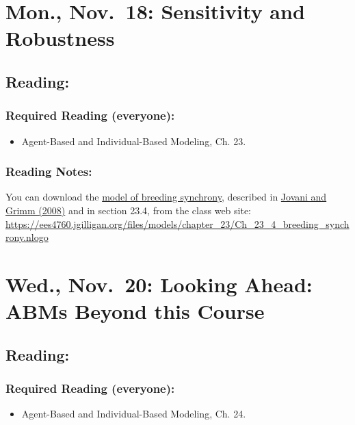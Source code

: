 \documentclass[
]{article}
\providecommand{\tightlist}{%
  \setlength{\itemsep}{0pt}\setlength{\parskip}{0pt}}
\begin{document}
\section{Mon., Nov.~18: Sensitivity and
Robustness}\label{mon.-nov.-18-sensitivity-and-robustness}

\subsection{Reading:}\label{reading-24}

\subsubsection{Required Reading
(everyone):}\label{required-reading-everyone-21}

\begin{itemize}
\tightlist
\item
  Agent-Based and Individual-Based Modeling, Ch. 23.
\end{itemize}

\subsubsection{Reading Notes:}\label{reading-notes-16}

You can download the
\href{/files/models/chapter_23/Ch_23_4_breeding_synchrony.nlogo}{model
of breeding synchrony}, described in
\href{/files/models/chapter_05/Jovani_Grimm_2008_Breeding.pdf}{Jovani
and Grimm (2008)} and in section 23.4, from the class web site:
\url{https://ees4760.jgilligan.org/files/models/chapter_23/Ch_23_4_breeding_synchrony.nlogo}

\section{Wed., Nov.~20: Looking Ahead: ABMs Beyond this
Course}\label{wed.-nov.-20-looking-ahead-abms-beyond-this-course}

\subsection{Reading:}\label{reading-25}

\subsubsection{Required Reading
(everyone):}\label{required-reading-everyone-22}

\begin{itemize}
\tightlist
\item
  Agent-Based and Individual-Based Modeling, Ch. 24.
\end{itemize}
\end{document}
